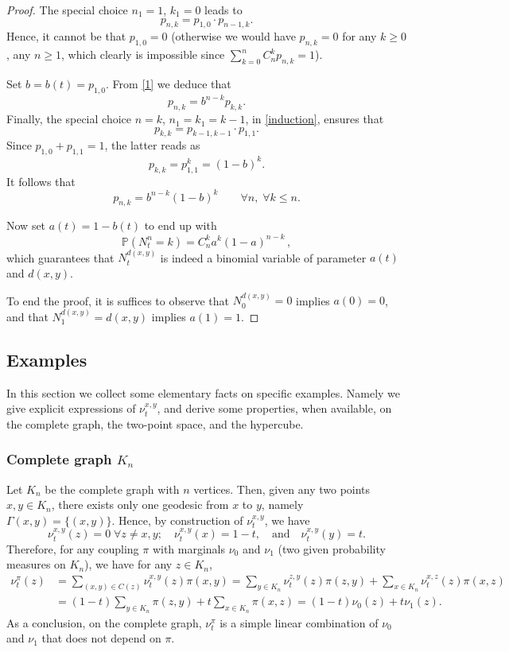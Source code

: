 \documentclass[11pt]{amsart}
\numberwithin{equation}{section}
\begin{document}
\begin{proof}
The special choice $n_1=1$, $k_1=0$ leads to
\begin{equation}\label{1}
p_{n,k} = p_{1,0} \cdot  p_{n-1,k} .
\end{equation}
Hence, it cannot be that $p_{1,0}=0$ (otherwise we would have $p_{n,k}=0$ for any $k \geq 0$, any $n \geq 1$, which clearly is impossible
since $\sum_{k=0}^n C_n^k p_{n,k} = 1$).

Set $b=b(t)=p_{1,0}$. From \eqref{1} we deduce that
$$
p_{n,k} = b^{n-k} p_{k,k} .
$$
Finally, the special choice $n=k$, $n_1=k_1=k-1$, in \eqref{induction}, ensures that
$$
p_{k,k} = p_{k-1,k-1} \cdot p_{1,1} .
$$
Since $p_{1,0}+p_{1,1} = 1$, the latter reads as
$$
p_{k,k} = p_{1,1}^k = (1-b)^k .
$$
It follows that
$$
p_{n,k} = b^{n-k} (1-b)^k  \qquad \forall n, \; \forall  k \leq n .
$$

Now set $a(t)=1-b(t)$ to end up with
$$
{\mathbb{P}}\left( N_t^{n} = k \right) = C_n^k a^k (1-a)^{n-k} \,,
$$
which guarantees that $N_t^{d(x,y)}$ is indeed a binomial variable of parameter $a(t)$ and $d(x,y)$.

To end the proof, it is suffices  to observe that $N_0^{d(x,y)}=0$ implies  $a(0)=0$, and that $N_1^{d(x,y)}=d(x,y)$ implies $a(1)=1$.
\end{proof}

\subsection{Examples}

In this section we collect some elementary facts on specific examples. Namely we give explicit expressions of $\nu_t^{x,y}$, and derive some properties, when available, on  the complete graph, the two-point space, and  the hypercube.

\subsubsection{Complete graph $K_n$} \label{sec:complete}

Let $K_n$ be the complete graph with $n$ vertices. Then, given any two points $x,y \in K_n$, there  exists only one geodesic from $x$ to $y$, namely $\Gamma(x,y)=\{(x,y)\}$.
Hence, by construction of $\nu_t^{x,y}$, we have 
\begin{equation} \label{marne}
\nu_t^{x,y}(z)=0 \;\forall z \neq x,y; \quad \nu_t^{x,y}(x)= 1-t, \quad \mbox{and} \quad  \nu_t^{x,y}(y)= t.
\end{equation}
Therefore, for any coupling $\pi$ with marginals $\nu_0$ and $\nu_1$ (two given probability measures on $K_n$), we have
for any $z \in K_n$,
\begin{align*}
\nu_t^\pi(z) 
& = 
\sum_{(x,y) \in C(z)} \nu_t^{x,y}(z) \pi(x,y) 
=
\sum_{y \in K_n} \nu_t^{z,y}(z) \pi(z,y) + \sum_{x \in K_n} \nu_t^{x,z}(z) \pi(x,z) \\
& =
(1-t) \sum_{y \in K_n} \pi(z,y) + t \sum_{x \in K_n} \pi(x,z) 
 =
(1-t) \nu_0(z) + t \nu_1(z) .
\end{align*}
As a conclusion, on the complete graph, $\nu_t^\pi$ is a simple linear combination of $\nu_0$ and $\nu_1$ that does not depend on $\pi$.
\end{document}

